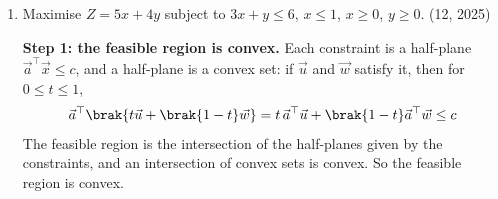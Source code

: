 \begin{enumerate}[label=\thesubsection.\arabic*, ref=\thesubsection.\theenumi]
\solution
The trace and determinant are
\begin{align}
	\text{tr}\brak{\vec{A}} = 2 + 2 = 4, \qquad \abs{\vec{A}} = 2\brak{2} - 3\brak{-1} = 7
\end{align}
The characteristic polynomial of a $2\times2$ matrix is $\lambda^2 - \text{tr}\brak{\vec{A}}\lambda + \abs{\vec{A}}$, so
\begin{align}
	\lambda^2 - 4\lambda + 7 = 0 \implies \lambda = \frac{4 \pm \sqrt{16-28}}{2} = 2 \pm i\sqrt{3}
\end{align}
The eigenvalues sum to $4$ (the trace) and multiply to $7$ (the determinant). By the Cayley--Hamilton theorem, $\vec{A}$ satisfies its own characteristic equation:
\begin{align}
	\vec{A}^2 - 4\vec{A} + 7\vec{I} = \vec{0}
\end{align}
Direct verification: $\vec{A}^2 = \myvec{1 & 12 \\ -4 & 1}$, $4\vec{A} = \myvec{8 & 12 \\ -4 & 8}$, $7\vec{I} = \myvec{7 & 0 \\ 0 & 7}$, so
\begin{align}
	\vec{A}^2 - 4\vec{A} + 7\vec{I} = \myvec{1-8+7 & 12-12 \\ -4+4 & 1-8+7} = \myvec{0 & 0 \\ 0 & 0}
\end{align}
The following code verifies the solution
\begin{lstlisting}[frame=single, basicstyle=\rmfamily, escapeinside={(*@}{@*)}]
(*@\makebox[\dimexpr\linewidth-2\fboxsep-2\fboxrule\relax][c]{12/codes/22.py}@*)
\end{lstlisting}

\item
Maximise $Z = 5x + 4y$ subject to $3x + y \le 6$, $x \le 1$, $x \ge 0$, $y \ge 0$.
\hfill (12, 2025)

\solution
\textbf{Step 1: the feasible region is convex.} Each constraint is a half-plane $\vec{a}^{\top}\vec{x} \le c$, and a half-plane is a convex set: if $\vec{u}$ and $\vec{w}$ satisfy it, then for $0 \le t \le 1$,
\begin{align}
	\vec{a}^{\top}\brak{t\vec{u} + \brak{1-t}\vec{w}} = t\,\vec{a}^{\top}\vec{u} + \brak{1-t}\vec{a}^{\top}\vec{w} \le c
\end{align}
The feasible region is the intersection of the half-planes given by the constraints, and an intersection of convex sets is convex. So the feasible region is convex.


\end{enumerate}
